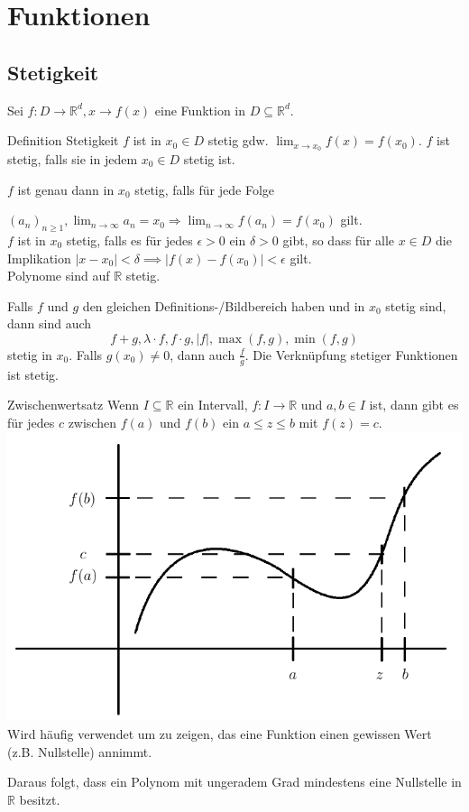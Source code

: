 \documentclass[a4paper,10pt]{article}
\def\limn{\lim_{n\to \infty}}
\def\R{\mathbb{R}}
\begin{document}
\section{Funktionen}
\subsection{Stetigkeit}
Sei $f : D \to \R^d, x \to f(x)$ eine Funktion in $D \subseteq \R^d$.
\begin{mainbox}{Definition Stetigkeit}
 $f$ ist in $x_0 \in D$ stetig gdw. $\lim_{x\to x_0} f(x) = f(x_0)$.
 $f$ ist stetig, falls sie in jedem $x_0 \in D$ stetig ist.
\end{mainbox}

$f$ ist genau dann in $x_0$ stetig, falls für jede Folge \par $(a_n)_{n\geq 1}, \limn a_n = x_0 \Rightarrow \limn f(a_n) = f(x_0)$ gilt.\\

$f$ ist in $x_0$ stetig, falls es für jedes $\epsilon > 0$ ein $\delta > 0$ gibt, so dass für alle $x \in D$ die Implikation $|x - x_0| < \delta \implies |f(x) - f(x_0)| < \epsilon$ gilt.\\

Polynome sind auf $\R$ stetig.
\begin{subbox}{}
 Falls $f$ und $g$ den gleichen Definitions-/Bildbereich haben und in $x_0$ stetig sind, dann sind auch $$f + g, \lambda \cdot f, f \cdot g, |f|, \max(f,g), \min(f,g)$$ stetig in $x_0$. Falls $g(x_0) \neq 0$, dann auch $\frac{f}{g}$. Die Verknüpfung stetiger Funktionen ist stetig.
\end{subbox}

\begin{mainbox}{Zwischenwertsatz}
 Wenn $I \subseteq \R$ ein Intervall, $f: I \to \R$ und $a, b \in I$ ist, dann gibt es für jedes $c$ zwischen $f(a)$ und $f(b)$ ein $a \le z \le b$ mit $f(z) = c$.
 \includegraphics[width=\linewidth]{zwischenwertsatz.png}
 Wird häufig verwendet um zu zeigen, das eine Funktion einen gewissen Wert (z.B. Nullstelle) annimmt.
\end{mainbox}
Daraus folgt, dass ein Polynom mit ungeradem Grad mindestens eine Nullstelle in $\R$ besitzt.
\end{document}
